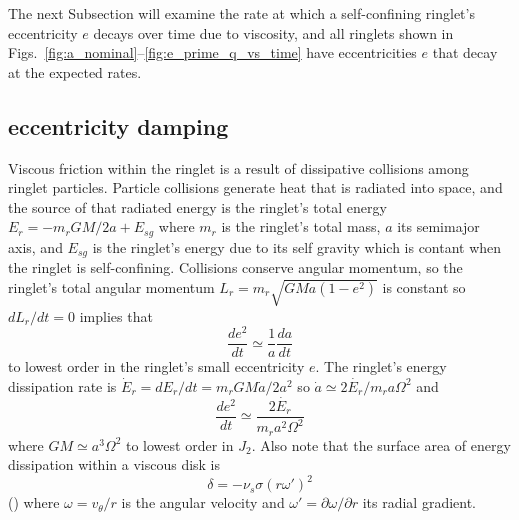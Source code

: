 \documentclass[preprint]{aastex62}
\begin{document}
The next Subsection will examine the rate at which
a self-confining ringlet's eccentricity $e$ decays over time due to viscosity, 
and all ringlets shown in Figs.\ \ref{fig:a_nominal}--\ref{fig:e_prime_q_vs_time}
have eccentricities $e$ that decay at the expected rates.


\subsection{eccentricity damping}
\label{subsec:eccentricity}

Viscous friction within the ringlet is a result of dissipative collisions among ringlet particles.
Particle collisions generate heat that is radiated into space, and the source of that radiated energy
is the ringlet's total energy $E_r=-m_rGM/2a + E_{sg}$ where $m_r$ is the ringlet's total
mass, $a$ its semimajor axis, and $E_{sg}$ is the ringlet's energy due to its self gravity
which is contant when the ringlet is self-confining. 
Collisions conserve angular momentum, so the ringlet's total angular momentum
$L_r=m_r\sqrt{GMa(1-e^2)}$ is constant so $dL_r/dt=0$ implies that
\begin{equation}
    \label{eqn:e2-dot}
    \frac{de^2}{dt} \simeq \frac{1}{a}\frac{da}{dt}
\end{equation}
to lowest order in the ringlet's small eccentricity $e$.
The ringlet's energy dissipation rate is $\dot{E}_r = dE_r/dt=m_rGM\dot{a}/2a^2$ so
$\dot{a}\simeq2\dot{E_r}/m_ra\Omega^2$ and 
\begin{equation}
    \label{eqn:de2/dt}
    \frac{de^2}{dt} \simeq \frac{2\dot{E_r}}{m_r a^2\Omega^2}
\end{equation}
where $GM\simeq a^3\Omega^2$ to lowest order in $J_2$. Also note that
the surface area of energy dissipation within a viscous disk is
\begin{equation}
    \delta = -\nu_s\sigma(r\omega')^2
\end{equation}
(\citealt{P81}) where $\omega=v_\theta/r$ is the angular velocity and 
$\omega'=\partial\omega/\partial r$ its radial gradient.
\end{document}

